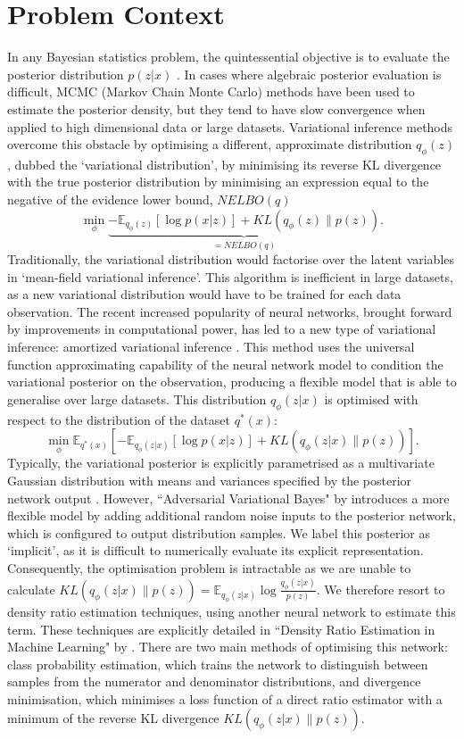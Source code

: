 \documentclass[honours,12pt]{unswthesis}
\newcommand{\E}{\mathbb{E}}
\numberwithin{equation}{section}
\theoremstyle{definition}
\begin{document}
\section{Problem Context}
In any Bayesian statistics problem, the quintessential objective is to evaluate the posterior distribution $p(z|x)$ \citep{gelman}. In cases where algebraic posterior evaluation is difficult, MCMC (Markov Chain Monte Carlo) methods have been used to estimate the posterior density, but they tend to have slow convergence when applied to high dimensional data or large datasets. Variational inference methods overcome this obstacle by optimising a different, approximate distribution $q_\phi(z)$, dubbed the `variational distribution', by minimising its reverse KL divergence with the true posterior distribution by minimising an expression equal to the negative of the evidence lower bound, $NELBO(q)$ \citep{blei}
\[\min_\phi \underbrace{-\E_{q_\phi(z)}[\log p(x|z)]+KL(q_\phi(z)\|p(z))}_{=NELBO(q)}.\]
Traditionally, the variational distribution would factorise over the latent variables in `mean-field variational inference'. This algorithm is inefficient in large datasets, as a new variational distribution would have to be trained for each data observation. The recent increased popularity of neural networks, brought forward by improvements in computational power, has led to a new type of variational inference: amortized variational inference \citep{ADVVI}. This method uses the universal function approximating capability of the neural network model to condition the variational posterior on the observation, producing a flexible model that is able to generalise over large datasets. This distribution $q_\phi(z|x)$ is optimised with respect to the distribution of the dataset $q^*(x)$: 
\[\min_{\phi} \E_{q^*(x)}\left[-\E_{q_\phi(z|x)}[\log p(x|z)]+KL(q_\phi(z|x)\|p(z))\right].\]
Typically, the variational posterior is explicitly parametrised as a multivariate Gaussian distribution with means and variances specified by the posterior network output \citep{kingma}. However, ``Adversarial Variational Bayes" by \citet{mescheder} introduces a more flexible model by adding additional random noise inputs to the posterior network, which is configured to output distribution samples. We label this posterior as `implicit', as it is difficult to numerically evaluate its explicit representation. Consequently, the optimisation problem is intractable as we are unable to calculate $KL(q_\phi(z|x)\|p(z))=\E_{q_\phi(z|x)}\log \frac{q_\phi(z|x)}{p(z)}$. We therefore resort to density ratio estimation techniques, using another neural network to estimate this term. These techniques are explicitly detailed in ``Density Ratio Estimation in Machine Learning" by \citet{sugiyama}. There are two main methods of optimising this network: class probability estimation, which trains the network to distinguish between samples from the numerator and denominator distributions, and divergence minimisation, which minimises a loss function of a direct ratio estimator with a minimum of the reverse KL divergence $KL(q_\phi(z|x)\|p(z))$. 
\end{document}
